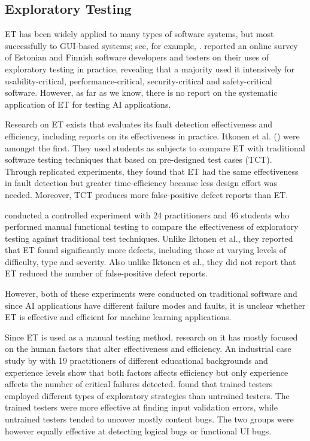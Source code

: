 \documentclass[preprint,1p,authoryear,times]{elsarticle}
\begin{document}
\subsection{Exploratory Testing}

ET has been widely applied to many types of software systems, but most successfully to GUI-based systems; see, for example, \citep{whittaker2009exploratory}. \citet{Pfahl_et_al2014} reported an online survey of Estonian and Finnish software developers and testers on their uses of exploratory testing in practice, revealing that a majority used it intensively for usability-critical, performance-critical, security-critical and safety-critical software. However, as far as we know, there is no report on the systematic application of ET for testing AI applications.  

Research on ET exists that evaluates its fault detection effectiveness and efficiency, including reports on its effectiveness in practice. Itkonen et al. (\citeyear{ItkonenAndRautiainen2005, Itkonen_et_al_2007,  ItkonenAndMantyla2014}) were amongst the first. They used students as subjects to compare ET with traditional software testing techniques that based on pre-designed test cases (TCT). Through replicated experiments, they found that ET had the same effectiveness in fault detection but greater time-efficiency because less design effort was needed. Moreover, TCT produces more false-positive defect reports than ET.

\citet{Afzal_et_al2014} conducted a controlled experiment with 24 practitioners and 46 students who performed manual functional testing to compare the effectiveness of exploratory testing against traditional test techniques. Unlike Iktonen et al., they reported that ET found significantly more defects, including those at varying levels of difficulty, type and severity. Also unlike Iktonen et al., they did not report that ET reduced the number of false-positive defect reports.

However, both of these experiments were conducted on traditional software and since AI applications have different failure modes and faults, it is unclear whether ET is effective and efficient for machine learning applications. 

Since ET is used as a manual testing method, research on it has mostly focused on the human factors that alter effectiveness and efficiency. An industrial case study by \citet{GebizliAndSozer2017} with 19 practitioners of different educational backgrounds and experience levels show that both factors affects efficiency but only experience affects the number of critical failures detected. \citet{Micallef_et_al2016} found that trained testers employed different types of exploratory strategies than untrained testers. The trained testers were more effective at finding input validation errors, while untrained testers tended to uncover mostly content bugs. The two groups were however equally effective at detecting logical bugs or functional UI bugs.
\end{document}
